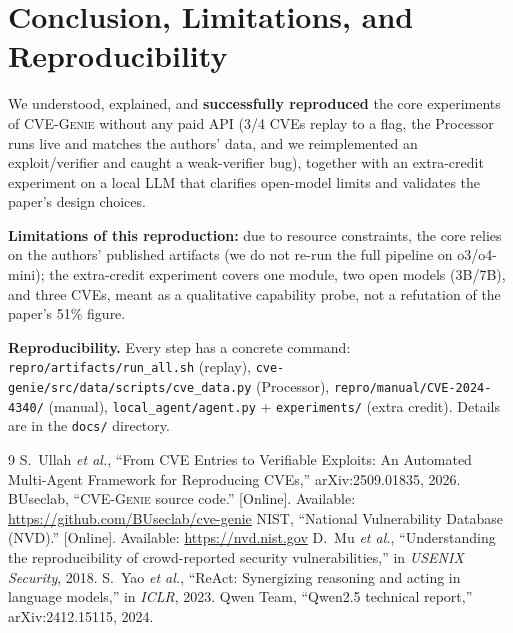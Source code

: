 \documentclass[conference,10pt,a4paper]{IEEEtran}
\newcommand{\code}[1]{\texttt{\small #1}}
\begin{document}
\section{Conclusion, Limitations, and Reproducibility}
We understood, explained, and \textbf{successfully reproduced} the core experiments of CVE-G\textsc{enie} without any paid API (3/4 CVEs replay to a flag, the Processor runs live and matches the authors' data, and we reimplemented an exploit/verifier and caught a weak-verifier bug), together with an extra-credit experiment on a local LLM that clarifies open-model limits and validates the paper's design choices.

\textbf{Limitations of this reproduction:} due to resource constraints, the core relies on the authors' published artifacts (we do not re-run the full pipeline on o3/o4-mini); the extra-credit experiment covers one module, two open models (3B/7B), and three CVEs, meant as a qualitative capability probe, not a refutation of the paper's 51\% figure.

\textbf{Reproducibility.} Every step has a concrete command: \code{repro/artifacts/run\_all.sh} (replay), \code{cve-genie/src/data/scripts/cve\_data.py} (Processor), \code{repro/manual/CVE-2024-4340/} (manual), \code{local\_agent/agent.py} + \code{experiments/} (extra credit). Details are in the \code{docs/} directory.

\begin{thebibliography}{9}
 S.~Ullah \textit{et al.}, ``From CVE Entries to Verifiable Exploits: An Automated Multi-Agent Framework for Reproducing CVEs,'' arXiv:2509.01835, 2026.
 BUseclab, ``CVE-G\textsc{enie} source code.'' [Online]. Available: \url{https://github.com/BUseclab/cve-genie}
 NIST, ``National Vulnerability Database (NVD).'' [Online]. Available: \url{https://nvd.nist.gov}
 D.~Mu \textit{et al.}, ``Understanding the reproducibility of crowd-reported security vulnerabilities,'' in \textit{USENIX Security}, 2018.
 S.~Yao \textit{et al.}, ``ReAct: Synergizing reasoning and acting in language models,'' in \textit{ICLR}, 2023.
 Qwen Team, ``Qwen2.5 technical report,'' arXiv:2412.15115, 2024.
\end{thebibliography}
\end{document}
